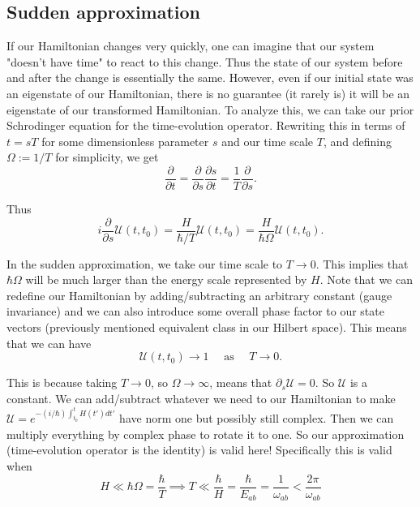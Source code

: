 \documentclass[12pt]{revtex4-2}
\begin{document}
\subsection{Sudden approximation}
If our Hamiltonian changes very quickly, one can imagine that our system "doesn't have time" to react to this change.  Thus the state of our system before and after the change is essentially the same.  However, even if our initial state was an eigenstate of our Hamiltonian, there is no guarantee (it rarely is) it will be an eigenstate of our transformed Hamiltonian.  To analyze this, we can take our prior Schrodinger equation for the time-evolution operator.  Rewriting this in terms of $t=sT$ for some dimensionless parameter $s$ and our time scale $T$, and defining $\Omega := 1/T$ for simplicity, we get 
\begin{equation}
    \frac{\partial}{\partial t} = \frac{\partial}{\partial s}\frac{\partial s}{\partial t} = \frac{1}{T}\frac{\partial}{\partial s}.
\end{equation}

Thus 
\begin{equation}
    i \frac{\partial}{\partial s}\mathcal{U}(t,t_0) = \frac{H}{\hbar/T}\mathcal{U}(t,t_0) = \frac{H}{\hbar\Omega} \mathcal{U}(t,t_0).
\end{equation}

In the sudden approximation, we take our time scale to $T \to 0$.  This implies that $\hbar\Omega$ will be much larger than the energy scale represented by $H$.  Note that we can redefine our Hamiltonian by adding/subtracting an arbitrary constant (gauge invariance) and we can also introduce some overall phase factor to our state vectors (previously mentioned equivalent class in our Hilbert space).  This means that we can have 
\begin{equation}
    \mathcal{U}(t,t_0) \to 1 \quad \text{ as } \quad T\to0.
\end{equation}

This is because taking $T\to0$, so $\Omega \to \infty$, means that $\partial_s\mathcal{U}=0$.  So $\mathcal{U}$ is a constant.  We can add/subtract whatever we need to our Hamiltonian to make $\mathcal{U}=e^{-(i/\hbar)\int_{t_0}^tH(t')dt'}$ have norm one but possibly still complex.  Then we can multiply everything by complex phase to rotate it to one.  So our approximation (time-evolution operator is the identity) is valid here!  Specifically this is valid when
\begin{equation}
    H \ll \hbar\Omega = \frac{\hbar}{T} \implies T \ll \frac{\hbar}{H} = \frac{\hbar}{E_{ab}} = \frac{1}{\omega_{ab}} < \frac{2\pi}{\omega_{ab}}
\end{equation}
\end{document}
